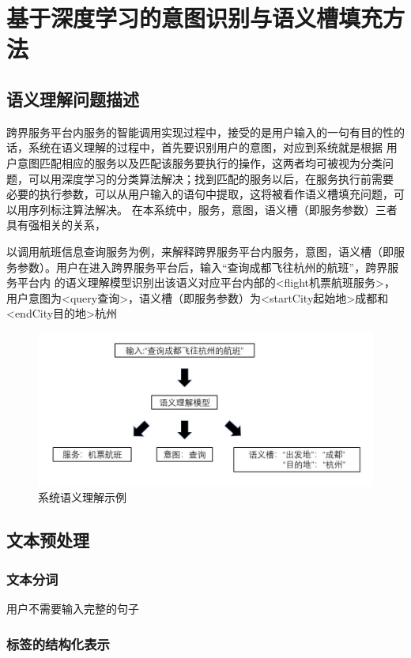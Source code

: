 \chapter{基于深度学习的意图识别与语义槽填充方法}

\section{语义理解问题描述}
跨界服务平台内服务的智能调用实现过程中，接受的是用户输入的一句有目的性的话，系统在语义理解的过程中，首先要识别用户的意图，对应到系统就是根据
用户意图匹配相应的服务以及匹配该服务要执行的操作，这两者均可被视为分类问题，可以用深度学习的分类算法解决；找到匹配的服务以后，在服务执行前需要
必要的执行参数，可以从用户输入的语句中提取，这将被看作语义槽填充问题，可以用序列标注算法解决。
在本系统中，服务，意图，语义槽（即服务参数）三者具有强相关的关系，

以调用航班信息查询服务为例，来解释跨界服务平台内服务，意图，语义槽（即服务参数）。用户在进入跨界服务平台后，输入“查询成都飞往杭州的航班”，跨界服务平台内
的语义理解模型识别出该语义对应平台内部的<flight机票航班服务>，用户意图为<query查询>，语义槽（即服务参数）为<startCity起始地>成都和<endCity目的地>杭州


\begin{figure}[htbp]
    \centering
    \includegraphics[scale=0.5]{./images/questiondesc.jpg}
    \caption{系统语义理解示例}
    \label{fig:questiondesc}
  \end{figure}


\section{文本预处理}
\subsection{文本分词}
用户不需要输入完整的句子

\subsection{标签的结构化表示}

